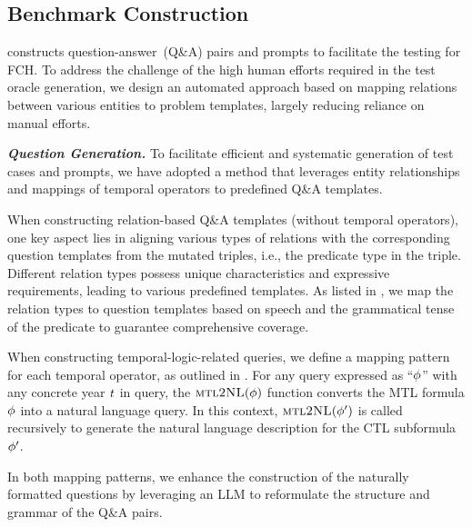 \subsection{Benchmark Construction}
\label{prompt}
\tool constructs question-answer~(Q\&A) pairs and prompts to facilitate the testing for FCH. 
To address the challenge of the high human efforts required in the test oracle generation, we design an automated approach based on mapping relations between various entities to problem templates, largely reducing reliance on manual efforts. 

\textbf{\emph{Question Generation.}}
To facilitate efficient and systematic generation of test cases and prompts, we have adopted a method that leverages entity relationships and mappings of temporal operators to predefined Q\&A templates. 

When constructing relation-based Q\&A templates (without temporal operators), one key aspect lies in aligning various types of relations with the corresponding question templates from the mutated triples, i.e., the predicate type in the triple. Different relation types possess unique characteristics and expressive requirements, leading to various predefined templates. 
As listed in , we map the relation types to question templates based on speech and the grammatical tense of the predicate to guarantee comprehensive coverage. 

When constructing temporal-logic-related queries, we define a mapping pattern for each temporal operator, as outlined in . For any query expressed as ``$\phi$''  with any concrete year $\mathit{t}$ in query, the $\textsc{mtl2NL}(\phi)$ function converts the MTL formula $\phi$ into a natural language query. In this context, $\textsc{mtl2NL}(\phi')$ is called recursively to generate the natural language description for the CTL subformula $\phi'$. 



In both mapping patterns, we enhance the construction of the naturally formatted questions by leveraging an LLM to reformulate the structure and grammar of the Q\&A pairs. 

